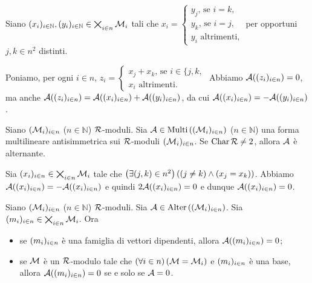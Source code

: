 \Proof Siano $(x_i)_{i \in \mathbb{N}}, (y_i)_{i \in \mathbb{N}} \in \bigtimes_{i \in n} \mathcal{M}_i$  tali che $x_i = \begin{cases} y_j\text{, se } i = k,\\ y_k\text{, se } i = j,\\ y_i\text{ altrimenti,}\end{cases}$ per opportuni $j,k \in n^2$ distinti.
\par Poniamo, per ogni $i \in n$, $z_i = \begin{cases} x_j + x_k\text{, se } i \in \lbrace j, k,\\ x_i\text{ altrimenti.}\end{cases}$ Abbiamo $\mathcal{A}((z_i)_{i \in n}) = 0$, ma anche $\mathcal{A}((z_i)_{i \in n}) = \mathcal{A}((x_i)_{i \in n}) + \mathcal{A}((y_i)_{i \in n})$, da cui $\mathcal{A}((x_i)_{i \in n}) = - \mathcal{A}((y_i)_{i \in n})$. \EndProof
\begin{Theorem}
	Siano $(\mathcal{M}_i)_{i \in n}$ ($n \in \mathbb{N}$) $\mathcal{R}$-moduli.
	Sia $\mathcal{A} \in \text{Multi}\left ( (\mathcal{M}_i)_{i \in n} \right )$ ($n \in \mathbb{N}$) una forma multilineare antisimmetrica sui $\mathcal{R}$-moduli $(\mathcal{M}_i)_{i \in n}$. Se $\operatorname{Char}{\mathcal{R}} \neq 2$, allora $\mathcal{A}$ \`e alternante.
\end{Theorem}
\Proof Sia $(x_i)_{i \in n} \in \bigtimes_{i \in n} \mathcal{M}_i$ tale che $\left ( \exists (j,k) \in n^2 \right ) \left ( \left ( j \neq k \right ) \wedge \left ( x_j = x_k \right ) \right )$. Abbiamo $\mathcal{A}((x_i)_{i \in n}) = - \mathcal{A}((x_i)_{i \in n})$ e quindi $2 \mathcal{A}((x_i)_{i \in n}) = 0$ e dunque $\mathcal{A}((x_i)_{i \in n}) = 0$. \EndProof
\begin{Theorem}
	Siano $(\mathcal{M}_i)_{i \in n}$ ($n \in \mathbb{N}$) $\mathcal{R}$-moduli.
	Sia $\mathcal{A} \in \text{Alter} \left ( (\mathcal{M}_i)_{i \in n} \right )$. Sia $(m_i)_{i \in n} \in \bigtimes_{i \in n} \mathcal{M}_i$. Ora
	\begin{itemize}
		\item se $(m_i)_{i \in n}$ \`e una famiglia di vettori dipendenti, allora $\mathcal{A}((m_i)_{i \in n}) = 0$;
		\item se $\mathcal{M}$ \`e un $\mathcal{R}$-modulo tale che $\left ( \forall i \in n \right ) \left ( \mathcal{M} = \mathcal{M}_i \right )$ e $(m_i)_{i \in n}$ \`e una base, allora $\mathcal{A}((m_i)_{i \in n}) = 0$ se e solo se $\mathcal{A} = 0$.
	\end{itemize}
\end{Theorem}
